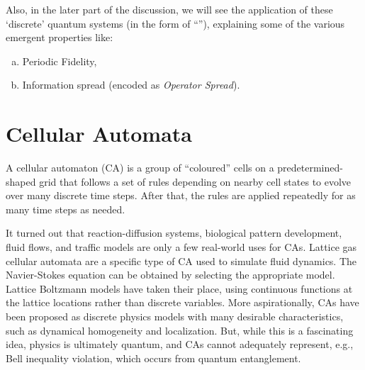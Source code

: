 \documentclass[11pt, oneside]{scrbook}
\begin{document}

Also, in the later part of the discussion, we will see the application of these `discrete' quantum systems (in the form of ``''\cite{Fisher2023}), explaining some of the various emergent properties like:
\begin{enumerate}[(a), noitemsep]
    \item Periodic Fidelity,
    \item Information spread (encoded as \emph{Operator Spread}).
\end{enumerate}

\section{Cellular Automata}

A cellular automaton (CA) is a group of ``coloured'' cells on a predetermined-shaped grid that follows a set of rules depending on nearby cell states to evolve over many discrete time steps. After that, the rules are applied repeatedly for as many time steps as needed.

It turned out that reaction-diffusion systems, biological pattern development, fluid flows, and traffic models are only a few real-world uses for CAs. Lattice gas cellular automata are a specific type of CA used to simulate fluid dynamics. The Navier-Stokes equation can be obtained by selecting the appropriate model. Lattice Boltzmann models have taken their place, using continuous functions at the lattice locations rather than discrete variables. More aspirationally, CAs have been proposed as discrete physics models with many desirable characteristics, such as dynamical homogeneity and localization. But, while this is a fascinating idea, physics is ultimately quantum, and CAs cannot adequately represent, e.g., Bell inequality violation, which occurs from quantum entanglement.
\end{document}
